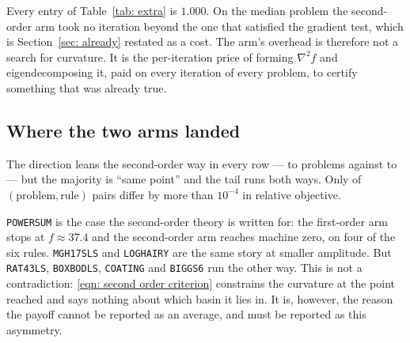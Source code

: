 \documentclass[11pt,a4paper]{article}
\theoremstyle{remark}
\begin{document}
Every entry of Table~\ref{tab: extra} is $1.000$. On the median problem the
second-order arm took no iteration beyond the one that satisfied the gradient
test, which is Section~\ref{sec: already} restated as a cost. The arm's overhead
is therefore not a search for curvature. It is the per-iteration price of forming
$\nabla^2 f$ and eigendecomposing it, paid on every iteration of every problem, to
certify something that was already true.

\subsection{Where the two arms landed}\label{sec: obj}

\begin{table}[H]
  \centering
  \caption{Final objective, first-order arm against second-order arm, pass~h,
    $n \leq \NMaxExact{}$, on problems where the first arm met
    \eqref{eqn: first order criterion} and the second met
    \eqref{eqn: second order criterion}. ``Same point'' is a relative gap below
    $10^{-8}$.}
  \label{tab: obj}
  
\end{table}

The direction leans the second-order way in every row --- \ObjSoMin{} to
\ObjSoMax{} problems against \ObjFoMin{} to \ObjFoMax{} --- but the majority is
``same point'' and the tail runs both ways. Only \NGapPairs{} of
\NComparedPairs{} $(\text{problem}, \text{rule})$ pairs differ by more than
$10^{-4}$ in relative objective.

\begin{table}[H]
  \centering
  \caption{The pairs where the arms genuinely disagreed: the sixteen largest
    relative gaps, of \NGapPairs{} exceeding $10^{-4}$. One row per
    $(\text{problem}, \text{rule})$ pair, because on \texttt{MGH17SLS} and
    \texttt{BIGGS6} the direction differs between rules and a per-problem row
    would state neither finding.}
  \label{tab: gaps}
  
\end{table}

\texttt{POWERSUM} is the case the second-order theory is written for: the
first-order arm stops at $f \approx 37.4$ and the second-order arm reaches machine
zero, on four of the six rules. \texttt{MGH17SLS} and \texttt{LOGHAIRY} are the
same story at smaller amplitude. But \texttt{RAT43LS}, \texttt{BOXBODLS},
\texttt{COATING} and \texttt{BIGGS6} run the other way. This is not a
contradiction: \eqref{eqn: second order criterion} constrains the curvature at the
point reached and says nothing about which basin it lies in. It is, however, the
reason the payoff cannot be reported as an average, and must be reported as this
asymmetry.
\end{document}
